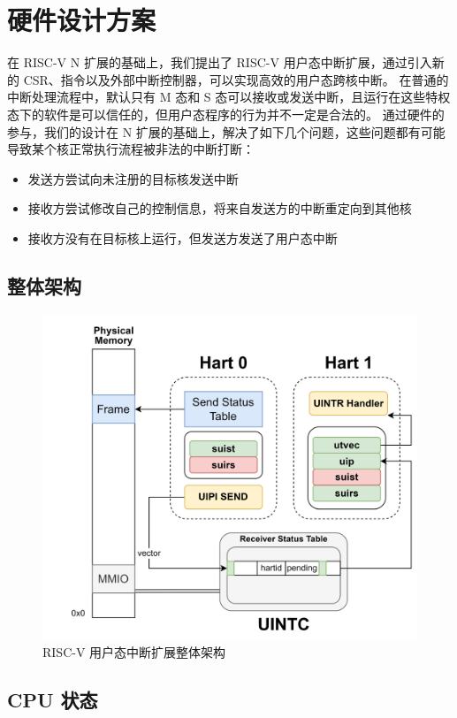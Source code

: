 
\chapter{硬件设计方案}

在 RISC-V N 扩展的基础上，我们提出了 RISC-V 用户态中断扩展，通过引入新的 CSR、指令以及外部中断控制器，可以实现高效的用户态跨核中断。
在普通的中断处理流程中，默认只有 M 态和 S 态可以接收或发送中断，且运行在这些特权态下的软件是可以信任的，但用户态程序的行为并不一定是合法的。
通过硬件的参与，我们的设计在 N 扩展的基础上，解决了如下几个问题，这些问题都有可能导致某个核正常执行流程被非法的中断打断：

\begin{itemize}
    \item 发送方尝试向未注册的目标核发送中断
    \item 接收方尝试修改自己的控制信息，将来自发送方的中断重定向到其他核
    \item 接收方没有在目标核上运行，但发送方发送了用户态中断
\end{itemize}

\section{整体架构}

\begin{figure}
    \centering
    \includegraphics[width=0.8\linewidth]{figures/uintr.png}
    \caption{RISC-V 用户态中断扩展整体架构}
    \label{fig:uintr}
\end{figure}

\section{CPU 状态}

